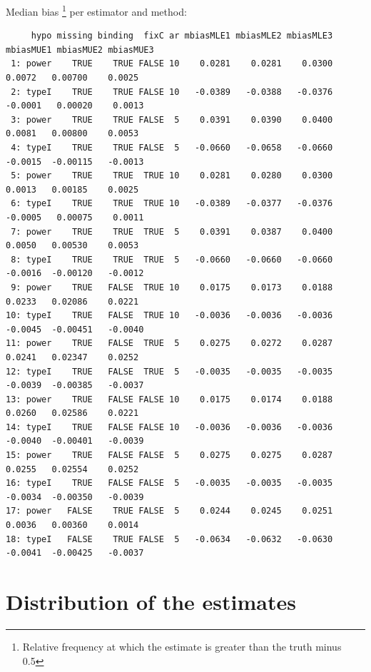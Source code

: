 \documentclass[12pt]{article}
\begin{document}
Median bias \footnote{Relative frequency at which the estimate is greater than the truth minus 0.5} per estimator and method:
\begin{adjustwidth}{-1cm}{-1cm}
\begin{verbatim}
     hypo missing binding  fixC ar mbiasMLE1 mbiasMLE2 mbiasMLE3 mbiasMUE1 mbiasMUE2 mbiasMUE3
 1: power    TRUE    TRUE FALSE 10    0.0281    0.0281    0.0300    0.0072   0.00700    0.0025
 2: typeI    TRUE    TRUE FALSE 10   -0.0389   -0.0388   -0.0376   -0.0001   0.00020    0.0013
 3: power    TRUE    TRUE FALSE  5    0.0391    0.0390    0.0400    0.0081   0.00800    0.0053
 4: typeI    TRUE    TRUE FALSE  5   -0.0660   -0.0658   -0.0660   -0.0015  -0.00115   -0.0013
 5: power    TRUE    TRUE  TRUE 10    0.0281    0.0280    0.0300    0.0013   0.00185    0.0025
 6: typeI    TRUE    TRUE  TRUE 10   -0.0389   -0.0377   -0.0376   -0.0005   0.00075    0.0011
 7: power    TRUE    TRUE  TRUE  5    0.0391    0.0387    0.0400    0.0050   0.00530    0.0053
 8: typeI    TRUE    TRUE  TRUE  5   -0.0660   -0.0660   -0.0660   -0.0016  -0.00120   -0.0012
 9: power    TRUE   FALSE  TRUE 10    0.0175    0.0173    0.0188    0.0233   0.02086    0.0221
10: typeI    TRUE   FALSE  TRUE 10   -0.0036   -0.0036   -0.0036   -0.0045  -0.00451   -0.0040
11: power    TRUE   FALSE  TRUE  5    0.0275    0.0272    0.0287    0.0241   0.02347    0.0252
12: typeI    TRUE   FALSE  TRUE  5   -0.0035   -0.0035   -0.0035   -0.0039  -0.00385   -0.0037
13: power    TRUE   FALSE FALSE 10    0.0175    0.0174    0.0188    0.0260   0.02586    0.0221
14: typeI    TRUE   FALSE FALSE 10   -0.0036   -0.0036   -0.0036   -0.0040  -0.00401   -0.0039
15: power    TRUE   FALSE FALSE  5    0.0275    0.0275    0.0287    0.0255   0.02554    0.0252
16: typeI    TRUE   FALSE FALSE  5   -0.0035   -0.0035   -0.0035   -0.0034  -0.00350   -0.0039
17: power   FALSE    TRUE FALSE  5    0.0244    0.0245    0.0251    0.0036   0.00360    0.0014
18: typeI   FALSE    TRUE FALSE  5   -0.0634   -0.0632   -0.0630   -0.0041  -0.00425   -0.0037
\end{verbatim}

\end{adjustwidth}

\clearpage

\section{Distribution of the estimates}
\label{sec:org984aff2}
\end{document}
